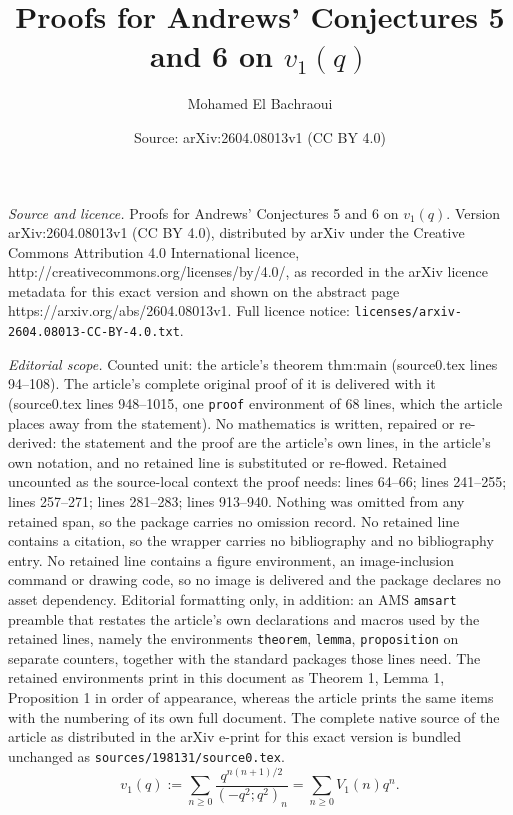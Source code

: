 \documentclass[10pt,a4paper]{amsart}
\title{Proofs for Andrews' Conjectures 5 and 6 on $v_1(q)$}
\author{Mohamed El Bachraoui}
\date{Source: arXiv:2604.08013v1 (CC BY 4.0)}
\begin{document}
\maketitle

\noindent\emph{Source and licence.} Proofs for Andrews' Conjectures 5 and 6 on $v_1(q)$. Version arXiv:2604.08013v1 (CC BY 4.0), distributed by arXiv under the Creative Commons Attribution 4.0 International licence, http://creativecommons.org/licenses/by/4.0/, as recorded in the arXiv licence metadata for this exact version and shown on the abstract page https://arxiv.org/abs/2604.08013v1. Full licence notice: \texttt{licenses/arxiv-2604.08013-CC-BY-4.0.txt}.\par\smallskip

\noindent\textit{Editorial scope.} Counted unit: the article's theorem thm:main (source0.tex lines 94--108). The article's complete original proof of it is delivered with it (source0.tex lines 948--1015, one \texttt{proof} environment of 68 lines, which the article places away from the statement). No mathematics is written, repaired or re-derived: the statement and the proof are the article's own lines, in the article's own notation, and no retained line is substituted or re-flowed.  Retained uncounted as the source-local context the proof needs: lines 64--66; lines 241--255; lines 257--271; lines 281--283; lines 913--940.  Nothing was omitted from any retained span, so the package carries no omission record.  No retained line contains a citation, so the wrapper carries no bibliography and no bibliography entry.  No retained line contains a figure environment, an image-inclusion command or drawing code, so no image is delivered and the package declares no asset dependency.  Editorial formatting only, in addition: an AMS \texttt{amsart} preamble that restates the article's own declarations and macros used by the retained lines, namely the environments \texttt{theorem}, \texttt{lemma}, \texttt{proposition} on separate counters, together with the standard packages those lines need.  The retained environments print in this document as Theorem 1, Lemma 1, Proposition 1 in order of appearance, whereas the article prints the same items with the numbering of its own full document.  The complete native source of the article as distributed in the arXiv e-print for this exact version is bundled unchanged as \texttt{sources/198131/source0.tex}.
\begin{equation}\label{eq:v1-def}
  v_1(q):=\sum_{n\ge 0}\frac{q^{n(n+1)/2}}{(-q^2;q^2)_n}=\sum_{n\ge 0}V_1(n)q^n.
\end{equation}
\end{document}
